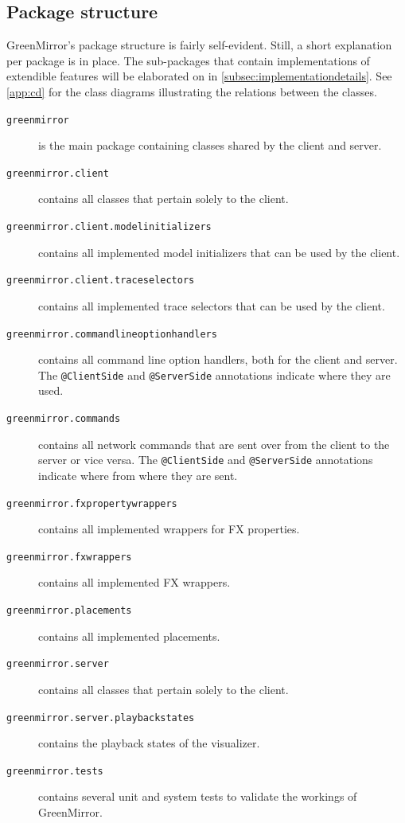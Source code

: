 \documentclass[a4paper]{article}
\begin{document}
	\subsection{Package structure}
	GreenMirror's package structure is fairly self-evident. Still, a short explanation per package is in place. The sub-packages that contain implementations of extendible features will be elaborated on in \cref{subsec:implementationdetails}. See \cref{app:cd} for the class diagrams illustrating the relations between the classes.
	\begin{description}
		\item[\texttt{greenmirror}] is the main package containing classes shared by the client and server.
		\item[\texttt{greenmirror.client}] contains all classes that pertain solely to the client.
		\item[\texttt{greenmirror.client.modelinitializers}] contains all implemented model initializers that can be used by the client.
		\item[\texttt{greenmirror.client.traceselectors}] contains all implemented trace selectors that can be used by the client.
		\item[\texttt{greenmirror.commandlineoptionhandlers}] contains all command line option handlers, both for the client and server. The \lstinline{@ClientSide} and \lstinline{@ServerSide} annotations indicate where they are used.
		\item[\texttt{greenmirror.commands}] contains all network commands that are sent over from the client to the server or vice versa. The \lstinline{@ClientSide} and \lstinline{@ServerSide} annotations indicate where from where they are sent.
		\item[\texttt{greenmirror.fxpropertywrappers}] contains all implemented wrappers for FX properties.
		\item[\texttt{greenmirror.fxwrappers}] contains all implemented FX wrappers.
		\item[\texttt{greenmirror.placements}] contains all implemented placements.
		\item[\texttt{greenmirror.server}] contains all classes that pertain solely to the client.
		\item[\texttt{greenmirror.server.playbackstates}] contains the playback states of the visualizer.
		\item[\texttt{greenmirror.tests}] contains several unit and system tests to validate the workings of GreenMirror.
	\end{description}
	
\end{document}
